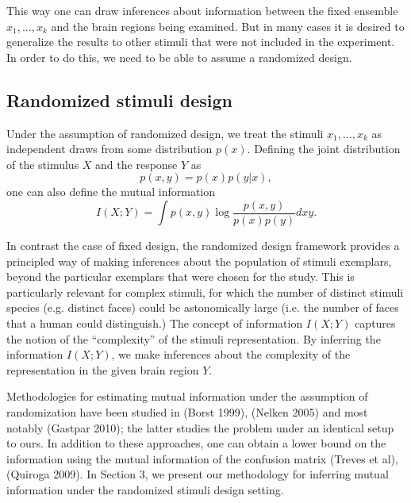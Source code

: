 \documentclass[12pt]{article}
\begin{document}
This way one can draw inferences about information between the fixed
ensemble $x_1,...,x_k$ and the brain regions being examined.  But in
many cases it is desired to generalize the results to other stimuli
that were not included in the experiment.  In order to do this, we
need to be able to assume a randomized design.

\subsection{Randomized stimuli design}

Under the assumption of randomized design, we treat the stimuli
$x_1,\hdots, x_k$ as independent draws from some distribution $p(x)$.
Defining the joint distribution of the stimulus $X$ and the response
$Y$ as
\[
p(x, y) = p(x) p(y|x),
\]
one can also define the mutual information
\[
I(X; Y) = \int p(x, y) \log \frac{p(x, y)}{p(x) p(y)} dxy.
\]

In contrast the case of fixed design, the randomized design framework
provides a principled way of making inferences about the population of
stimuli exemplars, beyond the particular exemplars that were chosen
for the study.  This is particularly relevant for complex stimuli, for
which the number of distinct stimuli species (e.g. distinct faces)
could be astonomically large (i.e. the number of faces that a human
could distinguish.)  The concept of information $I(X; Y)$ captures the
notion of the ``complexity'' of the stimuli representation.  By
inferring the information $I(X; Y)$, we make inferences about the
complexity of the representation in the given brain region $Y$.

Methodologies for estimating mutual information under the assumption
of randomization have been studied in (Borst 1999), (Nelken 2005) and
most notably (Gastpar 2010); the latter studies the problem under an
identical setup to ours.  In addition to these approaches, one can
obtain a lower bound on the information using the mutual information
of the confusion matrix (Treves et al), (Quiroga 2009).  In Section 3,
we present our methodology for inferring mutual information under the
randomized stimuli design setting.
\end{document}
